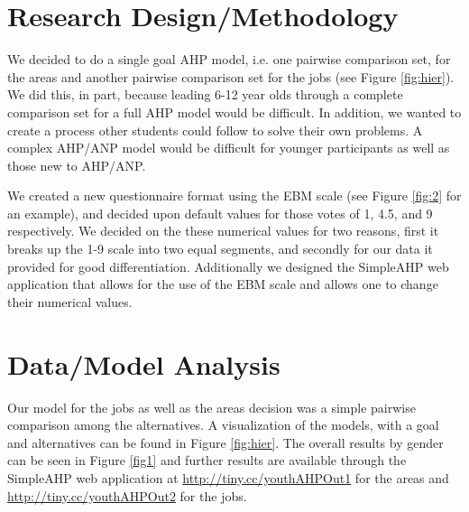 \documentclass[11pt]{article}
\begin{document}
\section{Research Design/Methodology}
We decided to do a single goal AHP model, i.e. one pairwise comparison set,
for the areas and another pairwise comparison set for the jobs (see Figure
\ref{fig:hier}).  We did this, in part, because
leading 6-12 year olds through a complete comparison set for a full AHP model would be
difficult.  In addition, we wanted to create a process other students could follow to
solve their own problems.   A complex AHP/ANP model would be difficult for younger participants
as well as those new to AHP/ANP.

We created a new questionnaire format using the EBM scale (see Figure \ref{fig:2}
for an example), and
decided upon default values for those votes of 1, 4.5, and 9 respectively.  We decided 
on the these numerical values for two reasons, first it breaks up the 1-9 scale into two equal
segments, and secondly for our data it provided for good differentiation.  Additionally we
designed the SimpleAHP web application that allows for the use of the EBM scale and
allows one to change their numerical values.


\section{Data/Model Analysis}
Our model for the jobs as well as the areas decision was a simple pairwise comparison
among the alternatives.  A visualization of the models, with a goal and alternatives
can be found in Figure \ref{fig:hier}.  
The overall results by gender can be seen in Figure \ref{fig1}
and further results are available through the SimpleAHP web application
at \url{http://tiny.cc/youthAHPOut1} for the areas and
\url{http://tiny.cc/youthAHPOut2} for the jobs.
\end{document}
